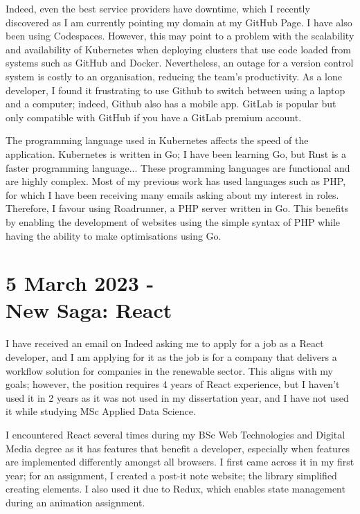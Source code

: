 \documentclass{article}
\begin{document}
Indeed, even the best service providers have downtime, which I recently discovered as I am currently pointing my domain at my GitHub Page. I have also been using Codespaces. However, this may point to a problem with the scalability and availability of Kubernetes when deploying clusters that use code loaded from systems such as GitHub and Docker. Nevertheless, an outage for a version control system is costly to an organisation, reducing the team's productivity. As a lone developer, I found it frustrating to use Github to switch between using a laptop and a computer; indeed, Github also has a mobile app. GitLab is popular but only compatible with GitHub if you have a GitLab premium account.

The programming language used in Kubernetes affects the speed of the application. Kubernetes is written in Go; I have been learning Go, but Rust is a faster programming language... These programming languages are functional and are highly complex. Most of my previous work has used languages such as PHP, for which I have been receiving many emails asking about my interest in roles. Therefore, I favour using Roadrunner, a PHP server written in Go. This benefits by enabling the development of websites using the simple syntax of PHP while having the ability to make optimisations using Go.




\section*{5 March 2023 - \\ New Saga: React}
I have received an email on Indeed asking me to apply for a job as a React developer, and I am applying for it as the job is for a company that delivers a workflow solution for companies in the renewable sector. This aligns with my goals; however, the position requires 4 years of React experience, but I haven't used it in 2 years as it was not used in my dissertation year, and I have not used it while studying MSc Applied Data Science. 

I encountered React several times during my BSc Web Technologies and Digital Media degree as it has features that benefit a developer, especially when features are implemented differently amongst all browsers. I first came across it in my first year; for an assignment, I created a post-it note website; the library simplified creating elements. I also used it due to Redux, which enables state management during an animation assignment.  
\end{document}
